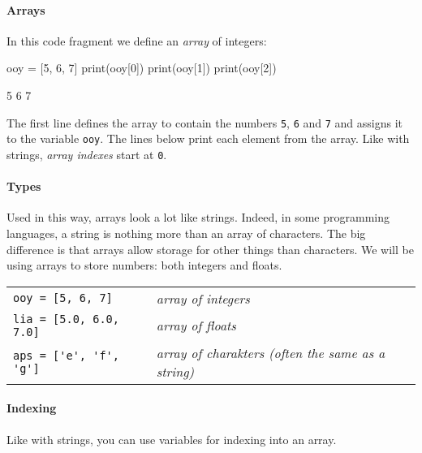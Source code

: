 \paragraph{Arrays}

In this code fragment we define an \emph{array} of integers:

\begin{minipage}[t]{0.5\textwidth}
\begin{nnflisting}
ooy = [5, 6, 7]
print(ooy[0])
print(ooy[1])
print(ooy[2])
\end{nnflisting}
\end{minipage}
\begin{minipage}[t]{0.5\textwidth}
\begin{listing}
5
6
7
\end{listing}
\end{minipage}

The first line defines the array to contain the numbers \texttt{5}, \texttt{6} and \texttt{7} and assigns it to the variable \texttt{ooy}. The lines below print each element from the array. Like with strings, \emph{array indexes} start at \texttt{0}.

\paragraph{Types}

Used in this way, arrays look a lot like strings. Indeed, in some programming languages, a string is nothing more than an array of characters. The big difference is that arrays allow storage for other things than characters. We will be using arrays to store numbers: both integers and floats.

\begin{tabular}{l@{\hskip 1em$\rightarrow$\hskip 1em}l}
\verb|ooy = [5, 6, 7]|       & \emph{array of integers} \\
\verb|lia = [5.0, 6.0, 7.0]| & \emph{array of floats} \\
\verb|aps = ['e', 'f', 'g']| & \emph{array of charakters (often the same as a string)}\\
\end{tabular}

\paragraph{Indexing}

Like with strings, you can use variables for indexing into an array.

